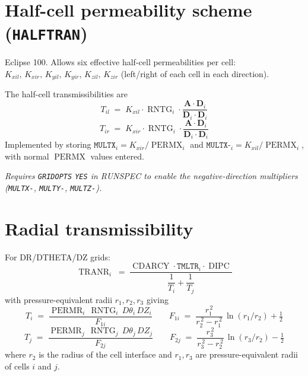 \documentclass[11pt,a4paper]{article}
\newcommand{\kw}[1]{\texttt{#1}}
\newcommand{\note}[1]{\par\smallskip\textit{#1}\par\smallskip}
\DeclareMathOperator{\CDARCY}{CDARCY}
\DeclareMathOperator{\TRANR}{TRANR}
\DeclareMathOperator{\DIPC}{DIPC}
\DeclareMathOperator{\RNTG}{RNTG}
\DeclareMathOperator{\PERMX}{PERMX}
\DeclareMathOperator{\PERMR}{PERMR}
\begin{document}
\section{Half-cell permeability scheme (\kw{HALFTRAN})}
Eclipse 100. Allows six effective half-cell permeabilities per cell:
$K_{xil},\,K_{xir},\,K_{yil},\,K_{yir},\,K_{zil},\,K_{zir}$ (left/right of each cell in each direction).

The half-cell transmissibilities are
\begin{equation}
T_{il} \;=\; K_{xil} \cdot \RNTG_i \cdot \frac{\mathbf{A}\cdot\mathbf{D}_i}{\mathbf{D}_i\cdot\mathbf{D}_i}
\label{eq:halftran-Til}
\tag{TD 2.14}
\end{equation}
\begin{equation}
T_{ir} \;=\; K_{xir} \cdot \RNTG_i \cdot \frac{\mathbf{A}\cdot\mathbf{D}_i}{\mathbf{D}_i\cdot\mathbf{D}_i}
\label{eq:halftran-Tir}
\tag{TD 2.15}
\end{equation}
Implemented by storing $\kw{MULTX}_i = K_{xir}/\PERMX_i$ and $\kw{MULTX-}_i = K_{xil}/\PERMX_i$,
with normal $\PERMX$ values entered.

\note{Requires \kw{GRIDOPTS} \kw{YES} in RUNSPEC to enable the negative-direction multipliers (\kw{MULTX-}, \kw{MULTY-}, \kw{MULTZ-}).}

\section{Radial transmissibility}

For DR/DTHETA/DZ grids:
\begin{equation}
\TRANR_i \;=\; \frac{\CDARCY \cdot \kw{TMLTR}_i \cdot \DIPC}{\dfrac{1}{T_i} + \dfrac{1}{T_j}}
\label{eq:radial-R}
\tag{TD 2.16}
\end{equation}
with pressure-equivalent radii $r_1, r_2, r_3$ giving
\[
T_i \;=\; \frac{\PERMR_i\,\RNTG_i\,D\theta_i\,DZ_i}{F_{1i}}
\qquad
F_{1i} \;=\; \frac{r_1^{\,2}}{r_2^{\,2}-r_1^{\,2}}\,\ln(r_1/r_2) + \tfrac{1}{2}
\]
\[
T_j \;=\; \frac{\PERMR_j\,\RNTG_j\,D\theta_j\,DZ_j}{F_{2j}}
\qquad
F_{2j} \;=\; \frac{r_3^{\,2}}{r_3^{\,2}-r_2^{\,2}}\,\ln(r_3/r_2) - \tfrac{1}{2}
\]
where $r_2$ is the radius of the cell interface and $r_1, r_3$ are pressure-equivalent radii of cells $i$ and $j$.
\end{document}
